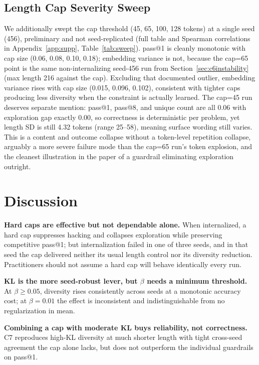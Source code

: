 \documentclass{article}
\begin{document}
\subsection{Length Cap Severity Sweep}
\label{sec:sweep}

We additionally swept the cap threshold (45, 65, 100, 128 tokens) at a single seed (456), preliminary and not seed-replicated (full table and Spearman correlations in Appendix~\ref{app:supp}, Table~\ref{tab:sweep}). pass@1 is cleanly monotonic with cap size (0.06, 0.08, 0.10, 0.18); embedding variance is not, because the cap=65 point is the same non-internalizing seed-456 run from Section~\ref{sec:c6instability} (max length 216 against the cap). Excluding that documented outlier, embedding variance rises with cap size (0.015, 0.096, 0.102), consistent with tighter caps producing less diversity when the constraint is actually learned. The cap=45 run deserves separate mention: pass@1, pass@8, and unique count are all 0.06 with exploration gap exactly 0.00, so correctness is deterministic per problem, yet length SD is still 4.32 tokens (range 25--58), meaning surface wording still varies. This is a content and outcome collapse without a token-level repetition collapse, arguably a more severe failure mode than the cap=65 run's token explosion, and the cleanest illustration in the paper of a guardrail eliminating exploration outright.

\section{Discussion}

\textbf{Hard caps are effective but not dependable alone.} When internalized, a hard cap suppresses hacking and collapses exploration while preserving competitive pass@1; but internalization failed in one of three seeds, and in that seed the cap delivered neither its usual length control nor its diversity reduction. Practitioners should not assume a hard cap will behave identically every run.

\textbf{KL is the more seed-robust lever, but $\beta$ needs a minimum threshold.} At $\beta \geq 0.05$, diversity rises consistently across seeds at a monotonic accuracy cost; at $\beta=0.01$ the effect is inconsistent and indistinguishable from no regularization in mean.

\textbf{Combining a cap with moderate KL buys reliability, not correctness.} C7 reproduces high-KL diversity at much shorter length with tight cross-seed agreement the cap alone lacks, but does not outperform the individual guardrails on pass@1.
\end{document}
